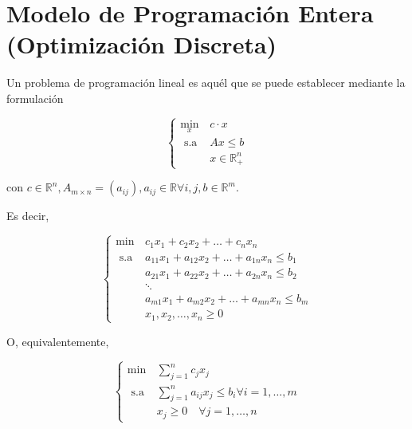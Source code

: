 \documentclass[openany]{book}
\begin{document}
\chapter{Modelo de Programación Entera (Optimización Discreta)}


Un problema de programación lineal es aquél que se puede establecer mediante la formulación

$$
\begin{cases}\min _{x} & c \cdot x \\ \text { s.a } & A x \leq b \\ & x \in \mathbb{R}_{+}^{n}\end{cases}
$$

con $c \in \mathbb{R}^{n}, A_{m \times n}=\left(a_{i j}\right), a_{i j} \in \mathbb{R} \forall i, j, b \in \mathbb{R}^{m}$.

Es decir,

$$
\begin{cases}\min & c_{1} x_{1}+c_{2} x_{2}+\ldots+c_{n} x_{n} \\ \text { s.a } & a_{11} x_{1}+a_{12} x_{2}+\ldots+a_{1 n} x_{n} \leq b_{1} \\ & a_{21} x_{1}+a_{22} x_{2}+\ldots+a_{2 n} x_{n} \leq b_{2} \\ & \ddots \\ \quad & a_{m 1} x_{1}+a_{m 2} x_{2}+\ldots+a_{m n} x_{n} \leq b_{m} \\ & x_{1}, x_{2}, \ldots, x_{n} \geq 0\end{cases}
$$

O, equivalentemente,

$$
\begin{cases}\min & \sum_{j=1}^{n} c_{j} x_{j} \\ \text { s.a } & \sum_{j=1}^{n} a_{i j} x_{j} \leq b_{i} \forall i=1, \ldots, m \\ & x_{j} \geq 0 \quad \forall j=1, \ldots, n\end{cases}
$$
\end{document}
